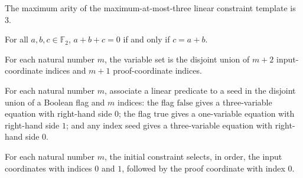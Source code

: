 \begin{theorem}
\label{FABL.maxArity_maxAtMostThreeLinTemplate}
\leanok
{}
The maximum arity of the maximum-at-most-three linear constraint template is $3$.
\end{theorem}

\begin{theorem}
\leanok
{}
For all $a,b,c\in\mathbb F_2$, $a+b+c=0$ if and only if $c=a+b$.
\end{theorem}

\begin{definition}
\label{FABL.OddWeightPartialSumVariable}
\leanok
For each natural number $m$, the variable set is the disjoint union of $m+2$
input-coordinate indices and $m+1$ proof-coordinate indices.
\end{definition}

\begin{definition}
\label{FABL.oddWeightPartialSumCSPPredicate}
\leanok
{}
For each natural number $m$, associate a linear predicate to a seed in the disjoint
union of a Boolean flag and $m$ indices: the flag $\mathrm{false}$ gives a
three-variable equation with right-hand side $0$; the flag $\mathrm{true}$ gives a
one-variable equation with right-hand side $1$; and any index seed gives a
three-variable equation with right-hand side $0$.
\end{definition}

\begin{definition}
\label{FABL.oddWeightPartialSumFirstCSPScope}
\leanok
{}
For each natural number $m$, the initial constraint selects, in order, the input
coordinates with indices $0$ and $1$, followed by the proof coordinate with index $0$.
\end{definition}

